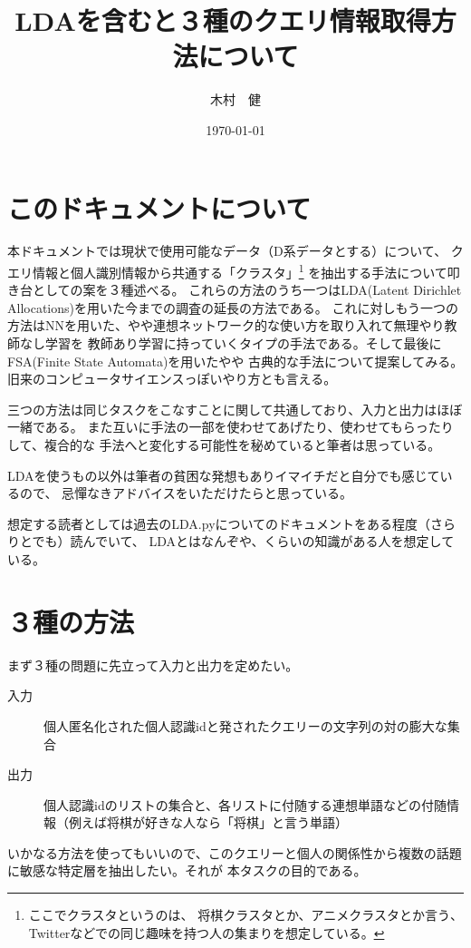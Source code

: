 \documentclass[uplatex]{jsarticle}
\begin{document}
\title{\huge LDAを含むと３種のクエリ情報取得方法について}
\author{木村　健}
\date{\today}
\maketitle

\section{このドキュメントについて}
本ドキュメントでは現状で使用可能なデータ（D系データとする）について、
クエリ情報と個人識別情報から共通する「クラスタ」\footnote{ここでクラスタというのは、
将棋クラスタとか、アニメクラスタとか言う、Twitterなどでの同じ趣味を持つ人の集まりを想定している。}
を抽出する手法について叩き台としての案を３種述べる。
これらの方法のうち一つはLDA(Latent Dirichlet Allocations)を用いた今までの調査の延長の方法である。
これに対しもう一つの方法はNNを用いた、やや連想ネットワーク的な使い方を取り入れて無理やり教師なし学習を
教師あり学習に持っていくタイプの手法である。そして最後にFSA(Finite State Automata)を用いたやや
古典的な手法について提案してみる。旧来のコンピュータサイエンスっぽいやり方とも言える。

三つの方法は同じタスクをこなすことに関して共通しており、入力と出力はほぼ一緒である。
また互いに手法の一部を使わせてあげたり、使わせてもらったりして、複合的な
手法へと変化する可能性を秘めていると筆者は思っている。

LDAを使うもの以外は筆者の貧困な発想もありイマイチだと自分でも感じているので、
忌憚なきアドバイスをいただけたらと思っている。

想定する読者としては過去のLDA.pyについてのドキュメントをある程度（さらりとでも）読んでいて、
LDAとはなんぞや、くらいの知識がある人を想定している。

\section{３種の方法}
まず３種の問題に先立って入力と出力を定めたい。
\begin{description}
\item[入力] 個人匿名化された個人認識idと発されたクエリーの文字列の対の膨大な集合
\item[出力] 個人認識idのリストの集合と、各リストに付随する連想単語などの付随情報（例えば将棋が好きな人なら「将棋」と言う単語）
\end{description}
いかなる方法を使ってもいいので、このクエリーと個人の関係性から複数の話題に敏感な特定層を抽出したい。それが
本タスクの目的である。
\end{document}
